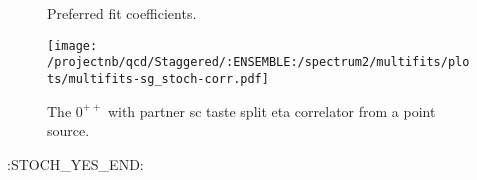 \begin{multicols}{2}
\begin{figure}[H]
\centering
\scriptsize

\caption{Preferred fit coefficients.}
\end{figure}
\columnbreak
\begin{figure}[H]
\centering
\texttt{[image: /projectnb/qcd/Staggered/:ENSEMBLE:/spectrum2/multifits/plots/multifits-sg\_stoch-corr.pdf]}
\caption{The $0^{++}$ with partner sc taste split eta correlator from a point source.}
\end{figure}
\end{multicols}

\clearpage
:STOCH_YES_END:


